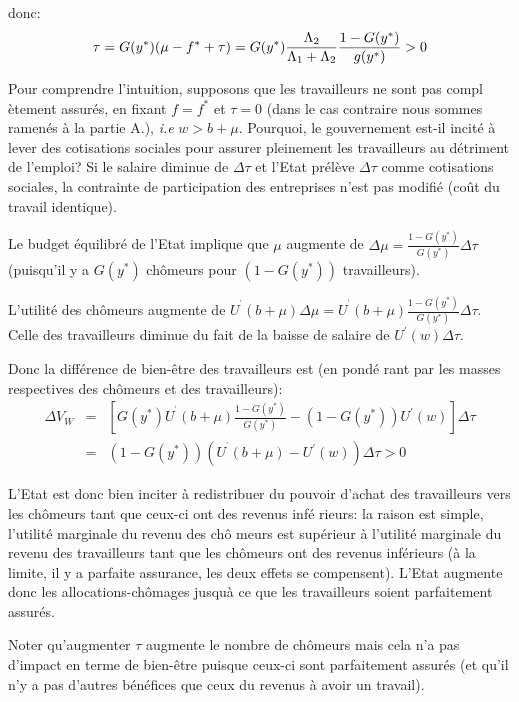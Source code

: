 \documentclass[a4paper]{article}
\begin{document}
donc:%
\begin{equation*}
\tau =G(y^{\ast })(\mu -f^{\ast }+\tau )=G(y^{\ast })\frac{\Lambda _{2}}{%
\Lambda _{1}+\Lambda _{2}}\frac{1-G(y^{\ast })}{g(y^{\ast })}>0
\end{equation*}

Pour comprendre l'intuition, supposons que les travailleurs ne sont pas compl%
\`{e}tement assur\'{e}s, en fixant $f=f^{\ast }$ et $\tau =0$ (dans le cas
contraire nous sommes ramen\'{e}s \`{a} la partie A.), \textit{i.e }$w>b+\mu 
$. Pourquoi, le gouvernement est-il incit\'{e} \`{a} lever des cotisations
sociales pour assurer pleinement les travailleurs au d\'{e}triment de
l'emploi? Si le salaire diminue de $\Delta \tau $ et l'Etat pr\'{e}l\`{e}ve $%
\Delta \tau $ comme cotisations sociales, la contrainte de participation des
entreprises n'est pas modifi\'{e} (co\^{u}t du travail identique).

Le budget \'{e}quilibr\'{e} de l'Etat implique que $\mu $ augmente de $%
\Delta \mu =\frac{1-G(y^{\ast })}{G(y^{\ast })}\Delta \tau $ (puisqu'il y a $%
G(y^{\ast })$ ch\^{o}meurs pour $\left( 1-G(y^{\ast })\right) $
travailleurs).

L'utilit\'{e} des ch\^{o}meurs augmente de $U^{^{\prime }}(b+\mu )\Delta \mu
=U^{^{\prime }}(b+\mu )\frac{1-G(y^{\ast })}{G(y^{\ast })}\Delta \tau $.
Celle des travailleurs diminue du fait de la baisse de salaire de $U^{\prime
}(w)\Delta \tau $.

Donc la diff\'{e}rence de bien-\^{e}tre des travailleurs est (en pond\'{e}%
rant par les masses respectives des ch\^{o}meurs et des travailleurs):%
\begin{eqnarray*}
\Delta V_{W} &=&\left[ G(y^{\ast })U^{^{\prime }}(b+\mu )\frac{1-G(y^{\ast })%
}{G(y^{\ast })}-\left( 1-G(y^{\ast })\right) U^{\prime }(w)\right] \Delta
\tau \\
&=&\left( 1-G(y^{\ast })\right) (U^{^{\prime }}(b+\mu )-U^{\prime
}(w))\Delta \tau >0
\end{eqnarray*}

L'Etat est donc bien inciter \`{a} redistribuer du pouvoir d'achat des
travailleurs vers les ch\^{o}meurs tant que ceux-ci ont des revenus inf\'{e}%
rieurs: la raison est simple, l'utilit\'{e} marginale du revenu des ch\^{o}%
meurs est sup\'{e}rieur \`{a} l'utilit\'{e} marginale du revenu des
travailleurs tant que les ch\^{o}meurs ont des revenus inf\'{e}rieurs (\`{a}
la limite, il y a parfaite assurance, les deux effets se compensent). L'Etat
augmente donc les allocations-ch\^{o}mages jusqu\`{a} ce que les
travailleurs soient parfaitement assur\'{e}s.

Noter qu'augmenter $\tau $ augmente le nombre de ch\^{o}meurs mais cela n'a
pas d'impact en terme de bien-\^{e}tre puisque ceux-ci sont parfaitement
assur\'{e}s (et qu'il n'y a pas d'autres b\'{e}n\'{e}fices que ceux du
revenus \`{a} avoir un travail).
\end{document}
